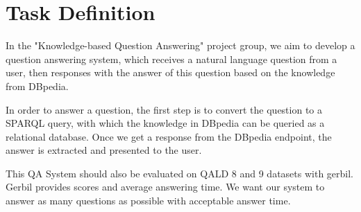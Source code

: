 
\section{Task Definition}

In the "Knowledge-based Question Answering" project group, 
we aim to develop a question answering system, 
which receives a natural language question from a user, 
then responses with the answer of this question based on the knowledge from DBpedia. 

In order to answer a question,
the first step is to convert the question to a SPARQL query,
with which the knowledge in DBpedia can be queried as a relational database. 
Once we get a response from the DBpedia endpoint, 
the answer is extracted and presented to the user. 

This QA System should also be evaluated on QALD 8 and 9 datasets with gerbil.
Gerbil provides scores and average answering time. 
We want our system to answer as many questions as possible with acceptable answer time. 